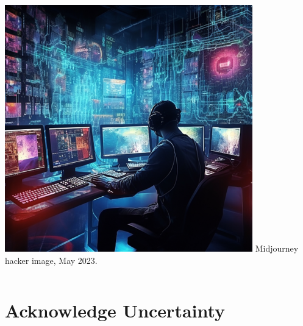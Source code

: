 \documentclass[11pt,
               aspectratio=169,
               hyperref={colorlinks}
               ]{beamer}
\begin{document}
\begin{frame}
\begin{columns}
				\centering
				\newline
				\includegraphics[width=\textwidth]{../img/security.png} 
				\newline
				\tiny{Midjourney hacker image, May 2023.}
			\end{columns}
					
		\end{frame}


	\section{Acknowledge Uncertainty}
\end{document}
